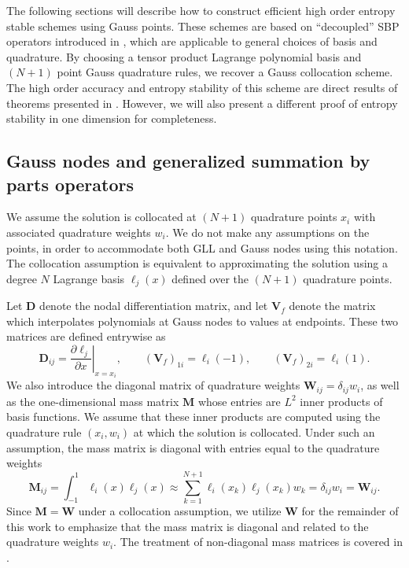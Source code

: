 \documentclass[review,onefignum,onetabnum,final]{siamart171218}
\newcommand{\pd}[2]{\frac{\partial#1}{\partial#2}}
\newcommand{\LRp}[1]{\left( #1 \right)}
\newcommand{\LRl}[1]{\left. #1 \right|}
\newcommand{\note}[1]{{\color{blue}{#1}}}
\begin{document}
The following sections will describe how to construct efficient high order entropy stable schemes using Gauss points.  These schemes are based on ``decoupled'' SBP operators introduced in \cite{chan2017discretely, chan2018discretely}, which are applicable to general choices of basis and quadrature.  By choosing a tensor product Lagrange polynomial basis and $(N+1)$ point Gauss quadrature rules, we recover a Gauss collocation scheme.  The high order accuracy and entropy stability of this scheme are direct results of theorems presented in  \cite{chan2017discretely, chan2018discretely}.  However, we will also present a different proof of entropy stability in one dimension for completeness.  

\subsection{Gauss nodes and generalized summation by parts operators}
\label{sec:gsbp}
We assume the solution is collocated at $(N+1)$ quadrature points $x_i$ with associated quadrature weights $w_i$.  We do not make any assumptions on the points, in order to accommodate both GLL and Gauss nodes using this notation.  The collocation assumption is equivalent to approximating the solution using a degree $N$ Lagrange basis $\ell_j(x)$ defined over the $(N+1)$ quadrature points.  

Let $\bm{D}$ denote the nodal differentiation matrix, and let $\bm{V}_f$ denote the \note{$2\times (N+1)$} matrix which interpolates polynomials at Gauss nodes to values at endpoints.  These two matrices are defined entrywise as
\[
\bm{D}_{ij} = \LRl{\pd{\ell_j}{x}}_{x = x_i}, \qquad \LRp{\bm{V}_f}_{1i} = \ell_i(-1), \qquad  \LRp{\bm{V}_f}_{2i} = \ell_i(1).
\]
We also introduce the diagonal matrix of quadrature weights $\bm{W}_{ij} = \delta_{ij} w_i$, as well as the one-dimensional mass matrix $\bm{M}$ whose entries are $L^2$ inner products of basis functions.  We assume that these inner products are computed using the quadrature rule $(x_i, w_i)$ at which the solution is collocated.  Under such an assumption, the mass matrix is diagonal with entries equal to the quadrature weights
\[
\bm{M}_{ij} = \int_{-1}^1 \ell_i(x)\ell_j(x) \approx \sum_{k=1}^{N+1} \ell_i(x_k)\ell_j(x_k) w_k = \delta_{ij} w_i = \bm{W}_{ij}.
\]
Since $\bm{M} = \bm{W}$ under a collocation assumption, we utilize $\bm{W}$ for the remainder of this work to emphasize that the mass matrix is diagonal and related to the quadrature weights $w_i$.  The treatment of non-diagonal mass matrices is covered in \cite{chan2017discretely, chan2018discretely}.
\end{document}
